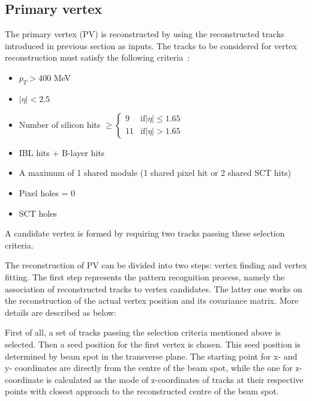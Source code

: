 \subsection{Primary vertex}

The primary vertex (PV) is reconstructed by using the reconstructed tracks introduced in previous section as inputs.
The tracks to be considered for vertex reconstruction must satisfy the following criteria~\cite{ATL-PHYS-PUB-2015-026}:
\begin{itemize}
	\item $p_{T} > 400$ MeV
	\item $|\eta| < 2.5$
	\item Number of silicon hits 
$\geq 
\begin{cases}
9&  \text{if} |\eta|\leq1.65\\
11& \text{if} |\eta|>1.65
\end{cases}$
	\item IBL hits + B-layer hits 
	\item A maximum of 1 shared module (1 shared pixel hit or 2 shared SCT hits)
	\item Pixel holes = 0
	\item SCT holes 
\end{itemize}
A candidate vertex is formed by requiring two tracks passing these selection criteria.

The reconstruction of PV can be divided into two steps\cite{Aaboud:2016rmg}: vertex finding and vertex fitting.
The first step represents the pattern recognition process, namely the association of reconstructed tracks to vertex candidates.
The latter one works on the reconstruction of the actual vertex position and its covariance matrix.
More details are described as below:

First of all, a set of tracks passing the selection criteria mentioned above is selected.
Then a seed position for the first vertex is chosen.
This seed position is determined by beam spot in the transverse plane.
The starting point for x- and y- coordinates are directly from the centre of the beam spot,
while the one for z-coordinate is calculated as the mode of z-coordinates of tracks at their respective points with closest approach to the reconstructed centre of the beam spot. 

